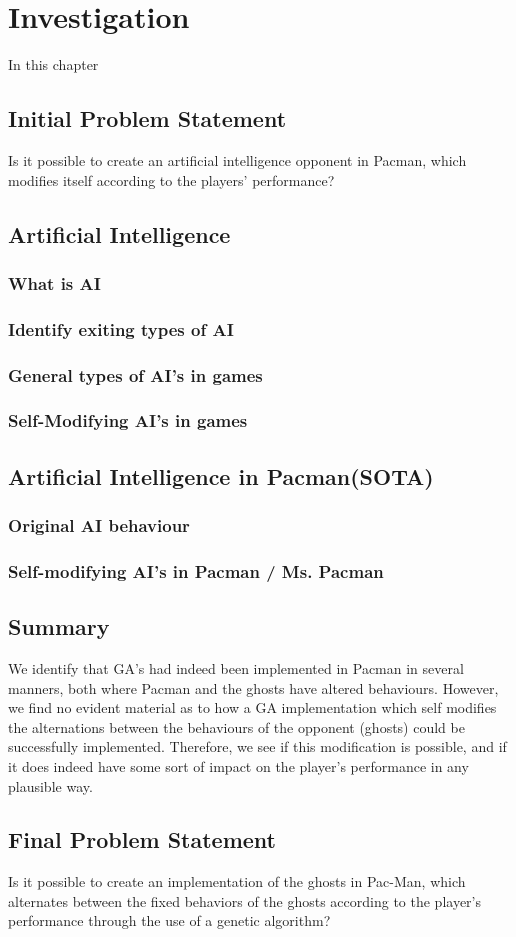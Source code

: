 \section{Investigation} \label{sec:preanalysus}
In this chapter 

\subsection{Initial Problem Statement} \label{sec:initialproblemstatement}
Is it possible to create an artificial intelligence opponent in Pacman, which modifies itself according to the players' performance?


\subsection{Artificial Intelligence} \label{sec:ai}
\subsubsection{What is AI}

\subsubsection{Identify exiting types of AI}
\subsubsection{General types of AI's in games}
\subsubsection{Self-Modifying AI's in games}


\subsection{Artificial Intelligence in Pacman(SOTA)}
\subsubsection{Original AI behaviour}
\subsubsection{Self-modifying AI's in Pacman / Ms. Pacman}

\subsection{Summary}
We identify that GA’s had indeed been implemented in Pacman in several manners, both where Pacman and the ghosts have altered behaviours. However, we find no evident material as to how a GA implementation which self modifies the alternations between the behaviours of the opponent (ghosts) could be successfully implemented. Therefore, we see if this modification is possible, and if it does indeed have some sort of impact on the player’s performance in any plausible way.


\subsection{Final Problem Statement} \label{sec:finalproblemstatement}
Is it possible to create an implementation of the ghosts in Pac-Man, which alternates between the fixed behaviors of the ghosts according to the player's performance through the use of a genetic algorithm?